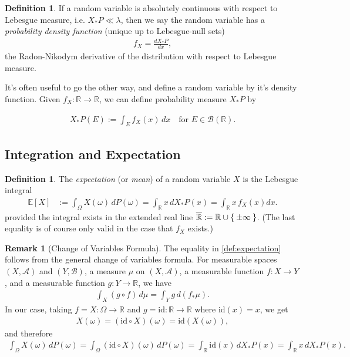 \documentclass[11pt,reqno]{amsart}
\theoremstyle{definition}
\newtheorem{definition}[theorem]{Definition}
\newtheorem{remark}[theorem]{Remark}
\theoremstyle{remark}
\begin{document}
\begin{definition}
	If a random variable is absolutely continuous with respect to Lebesgue measure, i.e. \(X_{*}P \ll \lambda\), then we say the random variable has a \emph{probability density function} (unique up to Lebesgue-null sets)
	\begin{align*}
		f_X = \frac{d X_{*}P}{dx},
	\end{align*}
	the Radon-Nikodym derivative of the distribution with respect to Lebesgue measure.
\end{definition}

It's often useful to go the other way, and define a random variable by it's density function. Given \(f_X: \mathbb{R} \rightarrow \mathbb{R}\), we can define probability measure \(X_{*}P\) by

\begin{align*}
	X_{*}P (E) := \int_E f_X(x) \, dx \quad \text{for } E \in \mathcal{B}(\mathbb{R}).
\end{align*}

\subsection{Integration and Expectation}

\begin{definition}
	The \emph{expectation} (or \emph{mean}) of a random variable $X$ is the Lebesgue integral
	\begin{align} \label{def:expectation}
		\mathbb{E}[X]
		 & := \int_\Omega X(\omega) \, dP(\omega)
		= \int_{\mathbb{R}} x \, dX_*P(x)
		= \int_{\mathbb{R}} x \, f_X(x) dx.
	\end{align}
	provided the integral exists in the extended real line $\overline{\mathbb{R}} := \mathbb{R} \cup \Set{\pm \infty}$. (The last equality is of course only valid in the case that \(f_X\) exists.)
\end{definition}

\begin{remark}[Change of Variables Formula]
	The equality in \eqref{def:expectation} follows from the general change of variables formula. For measurable spaces $(X, \mathcal{A})$ and $(Y, \mathcal{B})$, a measure $\mu$ on $(X, \mathcal{A})$, a measurable function $f: X \to Y$, and a measurable function $g: Y \to \mathbb{R}$, we have
	\begin{align*}
		\int_X (g \circ f) \, d\mu = \int_Y g \, d(f_*\mu).
	\end{align*}
	In our case, taking $f = X: \Omega \to \mathbb{R}$ and $g = \text{id}: \mathbb{R} \to \mathbb{R}$ where $\text{id}(x) = x$, we get
	\begin{align*}
		X(\omega) = (\text{id} \circ X)(\omega) = \text{id}(X(\omega)),
	\end{align*}
	and therefore
	\begin{align} \label{eq:change-of-variables}
		\int_\Omega X(\omega) \, dP(\omega)
		= \int_\Omega (\text{id} \circ X)(\omega) \, dP(\omega)
		= \int_{\mathbb{R}} \text{id}(x) \, dX_*P(x)
		= \int_{\mathbb{R}} x \, dX_*P(x).
	\end{align}
\end{remark}
\end{document}
